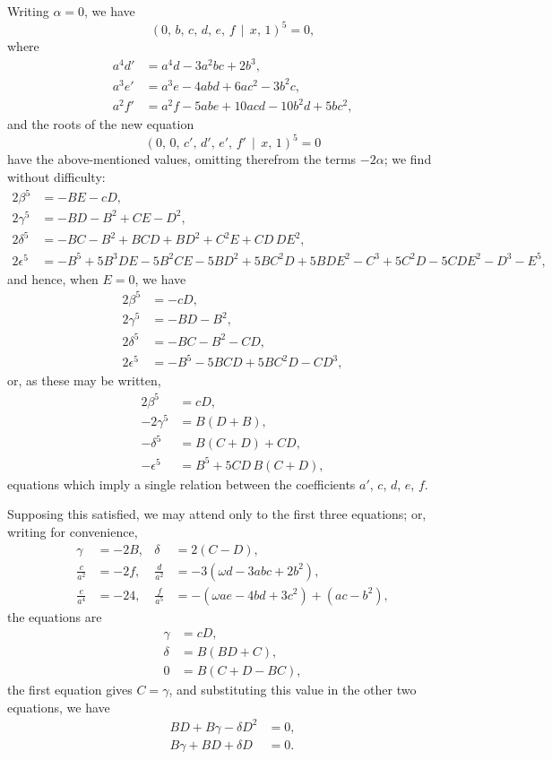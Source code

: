 \documentclass[11pt,a4paper]{article}
\theoremstyle{cayley}
\begin{document}
Writing $\alpha=0$, we have
\[
(0,\, b,\, c,\, d,\, e,\, f \,\!\!\mid\!\!\, x,\, 1)^{5} = 0,
\]
where
\begin{align*}
a^{4}d' &= a^{4}d - 3a^{2}bc + 2b^{3},\\
a^{3}e' &= a^{3}e - 4abd + 6ac^{2} - 3b^{2}c,\\
a^{2}f' &= a^{2}f - 5abe + 10acd - 10b^{2}d + 5bc^{2},
\end{align*}
and the roots of the new equation
\[
(0,\, 0,\, c',\, d',\, e',\, f' \,\!\!\mid\!\!\, x,\, 1)^{5} = 0
\]
have the above-mentioned values, omitting therefrom the terms $-2\alpha$; we find without difficulty:
\begin{align*}
2\beta^{5} &= -BE - cD,\\
2\gamma^{5} &= -BD - B^{2} + CE - D^{2},\\
2\delta^{5} &= -BC - B^{2} + BCD + BD^{2} + C^{2}E + CD\,DE^{2},\\
2\epsilon^{5} &= -B^{5} + 5B^{3}DE - 5B^{2}CE - 5BD^{2} + 5BC^{2}D + 5BDE^{2} - C^{3} + 5C^{2}D - 5CDE^{2} - D^{3} - E^{5},
\end{align*}
and hence, when $E=0$, we have
\begin{align*}
2\beta^{5} &= -cD,\\
2\gamma^{5} &= -BD - B^{2},\\
2\delta^{5} &= -BC - B^{2} - CD,\\
2\epsilon^{5} &= -B^{5} - 5BCD + 5BC^{2}D - CD^{3},
\end{align*}
or, as these may be written,
\begin{align*}
2\beta^{5} &= cD,\\
-2\gamma^{5} &= B(D+B),\\
-\delta^{5} &= B(C+D) + CD,\\
-\epsilon^{5} &= B^{5} + 5CD\,B(C+D),
\end{align*}
equations which imply a single relation between the coefficients $a'$, $c$, $d$, $e$, $f$.

Supposing this satisfied, we may attend only to the first three equations; or, writing for convenience,
\begin{align*}
\gamma &= -2B, & \delta &= 2(C-D),\\
\frac{c}{a^{2}} &= -2f, & \frac{d}{a^{2}} &= -3(\omega d - 3abc + 2b^{2}),\\
\frac{e}{a^{4}} &= -24, & \frac{f}{a^{5}} &= -(\omega ae - 4bd + 3c^{2}) + (ac - b^{2}),
\end{align*}
the equations are
\begin{align*}
\gamma &= cD,\\
\delta &= B(BD+C),\\
0 &= B(C+D-BC),
\end{align*}
the first equation gives $C = \gamma$, and substituting this value in the other two equations, we have
\begin{align*}
BD + B\gamma - \delta D^{2} &= 0,\\
B\gamma + BD + \delta D &= 0.
\end{align*}
\end{document}
